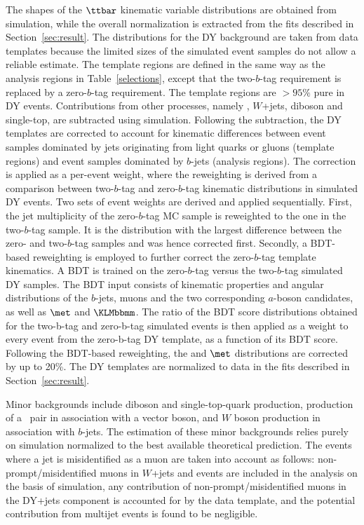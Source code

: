 \documentclass[cernpreprint, backref=false, texlive=2020, UKenglish, dvipsnames, block=none, texmf]{atlasdoc}
\begin{document}
The shapes of the $\ttbar$ kinematic variable  distributions are obtained from simulation, while the overall normalization is extracted from the fits described in Section~\ref{sec:result}.
The distributions for the DY background are taken from data templates because the limited sizes of the simulated event samples do not allow a reliable estimate. The template regions are defined in the same way as the analysis regions in Table~\ref{selections}, except that the two-$b$-tag requirement is replaced by a zero-$b$-tag requirement. The template regions are  ${>}95\%$ pure in DY events. Contributions from other processes, namely \ttbar, $W$+jets, diboson and single-top, are  subtracted using simulation.
Following the subtraction, the DY templates are corrected to account for kinematic differences between event samples dominated by jets originating from light quarks or gluons (template regions) and event samples dominated by $b$-jets (analysis regions). The correction is applied as a per-event weight, where the reweighting is derived from a comparison between two-$b$-tag and zero-$b$-tag kinematic distributions in simulated DY events.
Two sets of event weights are derived and applied sequentially.
First, the jet multiplicity of the zero-$b$-tag MC sample is reweighted to the one in the two-$b$-tag sample. It is the distribution with the largest difference between the zero- and two-$b$-tag samples and was hence corrected first.
Secondly, a BDT-based reweighting is employed to further correct the zero-$b$-tag template kinematics. A BDT is trained  on the zero-$b$-tag versus the two-$b$-tag simulated DY samples. The BDT input consists of kinematic properties and angular distributions of the $b$-jets, muons and the two corresponding $a$-boson candidates, as well as  $\met$ and  $\KLMbbmm$. The ratio of the BDT score distributions obtained for the two-b-tag and zero-b-tag simulated events is then applied as a weight to every event from the zero-b-tag DY template, as a function of its BDT score.
Following the BDT-based reweighting, the \KLMbbmm and $\met$ distributions are corrected by up to 20\%. The DY templates are normalized to data in the fits described in Section~\ref{sec:result}.
 
Minor backgrounds include diboson and single-top-quark production, production of a \ttbar\ pair in association with a vector boson, and $W$ boson production in association with $b$-jets.
The estimation of these minor backgrounds relies purely on simulation normalized to the best available theoretical prediction. The events where a jet is misidentified as a muon are taken into account as follows: non-prompt/misidentified muons in $W$+jets and \ttbar events are included in the analysis on the basis of simulation, any contribution of non-prompt/misidentified muons in the DY+jets component is accounted for by the data template, and the  potential contribution from multijet events is found to be negligible.
 
\end{document}
